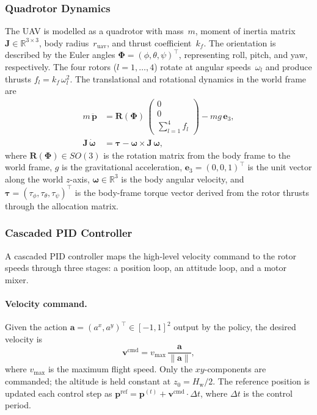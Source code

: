 \subsubsection{Quadrotor Dynamics}

The UAV is modelled as a quadrotor with mass~$m$, moment of inertia matrix
$\mathbf{J} \in \mathbb{R}^{3 \times 3}$, body radius~$r_{\mathrm{uav}}$, and
thrust coefficient~$k_f$.
The orientation is described by the Euler angles
$\boldsymbol{\Phi} = (\phi, \theta, \psi)^{\top}$, representing roll, pitch,
and yaw, respectively.
The four rotors ($l = 1,\dots,4$) rotate at angular speeds~$\omega_l$ and
produce thrusts $f_l = k_f\,\omega_l^2$.
The translational and rotational dynamics in the world frame are
\begin{align}
  m\,\ddot{\mathbf{p}} &=
    \mathbf{R}(\boldsymbol{\Phi})\,
    \begin{pmatrix}0\\0\\\sum_{l=1}^{4} f_l\end{pmatrix}
    - mg\,\mathbf{e}_3,
  \label{eq:trans_dyn} \\
  \mathbf{J}\,\dot{\boldsymbol{\omega}} &= \boldsymbol{\tau}
    - \boldsymbol{\omega} \times \mathbf{J}\,\boldsymbol{\omega},
  \label{eq:rot_dyn}
\end{align}
where $\mathbf{R}(\boldsymbol{\Phi}) \in SO(3)$ is the rotation matrix from
the body frame to the world frame, $g$ is the gravitational acceleration,
$\mathbf{e}_3 = (0,0,1)^{\top}$ is the unit vector along the world $z$-axis,
$\boldsymbol{\omega} \in \mathbb{R}^{3}$ is the body angular velocity, and
$\boldsymbol{\tau} = (\tau_\phi, \tau_\theta, \tau_\psi)^{\top}$ is the
body-frame torque vector derived from the rotor thrusts through the allocation
matrix.

\subsubsection{Cascaded PID Controller}

A cascaded PID controller maps the high-level velocity command to the rotor
speeds through three stages: a position loop, an attitude loop, and a motor
mixer.

\paragraph{Velocity command.}
Given the action $\mathbf{a} = (a^{x}, a^{y})^{\top} \in [-1,1]^{2}$
output by the policy, the desired velocity is
\begin{equation}
  \mathbf{v}^{\mathrm{cmd}} = v_{\max}\,
  \frac{\mathbf{a}}{\lVert\mathbf{a}\rVert},
  \label{eq:vel_cmd}
\end{equation}
where $v_{\max}$ is the maximum flight speed.
Only the $xy$-components are commanded; the altitude is held constant at
$z_0 = H_{\mathrm{w}}/2$.
The reference position is updated each control step as
$\mathbf{p}^{\mathrm{ref}} = \mathbf{p}^{(t)} +
\mathbf{v}^{\mathrm{cmd}} \cdot \Delta t$,
where $\Delta t$ is the control period.

